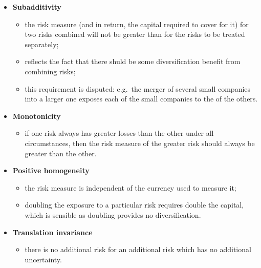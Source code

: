 \documentclass[notoc,notitlepage]{tufte-book}
\begin{document}
\begin{itemize}
  \item \textbf{Subadditivity}
    \begin{itemize}
      \item the risk measure (and in return, the capital required to cover for it) for two risks combined will not be greater than for the risks to be treated separately;
      \item reflects the fact that there shuld be some diversification benefit from combining risks;
      \item this requirement is disputed: e.g.\ the merger of several small companies into a larger one exposes each of the small companies to the  of the others.
    \end{itemize}

  \item \textbf{Monotonicity}
    \begin{itemize}
      \item if one risk always has greater losses than the other under all circumstances, then the risk measure of the greater risk should always be greater than the other.
    \end{itemize}

  \item \textbf{Positive homogeneity}
    \begin{itemize}
      \item the risk measure is independent of the currency used to measure it;
      \item doubling the exposure to a particular risk requires double the capital, which is sensible as doubling provides no diversification.
    \end{itemize}

  \item \textbf{Translation invariance}
    \begin{itemize}
      \item there is no additional risk for an additional risk which has no additional uncertainty.
    \end{itemize}
\end{itemize}



\backmatter\

\pagestyle{plain}

\nobibliography*




\printindex
\end{document}
